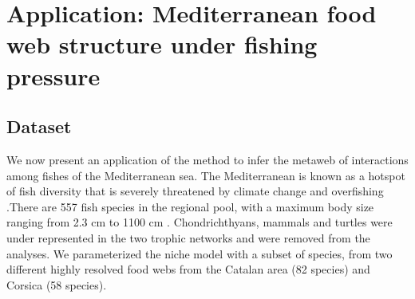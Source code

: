 \documentclass[12pt]{article}
\begin{document}
\section{Application: Mediterranean food web structure under fishing pressure}
\subsection{Dataset}
We now present an application of the method to infer the metaweb of interactions
among fishes of the Mediterranean sea. The Mediterranean is known as a hotspot
of fish diversity that is severely threatened by climate change and overfishing
\parencite{Mouillot2011}.There are 557 fish species in the regional pool, with a
maximum body size ranging from 2.3 cm to 1100 cm \parencite{Whithead1986,
Louisy2005, Froese2011}. Chondrichthyans, mammals and turtles were under
represented in the two trophic networks and were removed from the analyses. We
parameterized the niche model with a subset of species, from two different
highly resolved food webs from the Catalan area \parencite{Coll2006} (82
species) and Corsica \parencite{Albouy2010} (58 species).
\end{document}
